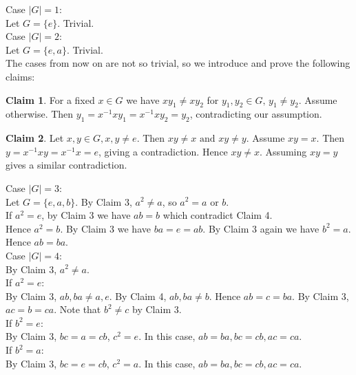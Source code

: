 \documentclass[A4paper,12pt]{article}
\theoremstyle{definition}
\newtheorem{claim}{Claim}
\numberwithin{equation}{section}
\begin{document}
\begin{enumerate}[1)]
\begin{enumerate}[(a)]
                Case $|G|=1$:\\
                Let $G = \{e\}$. Trivial.\\
                Case $|G|=2$:\\
                Let $G = \{e, a\}$. Trivial.\\
                The cases from now on are not so trivial, so we introduce and prove the following claims:\\
                \begin{claim}
                    For a fixed $x \in G$ we have $xy_{1} \neq xy_{2}$ for $y_{1}, y_{2} \in G,\, y_{1} \neq y_{2}.$
                    \proof
                    Assume otherwise. Then $y_{1} =x^{-1}xy_{1} = x^{-1}xy_{2}=y_{2}$, contradicting our assumption.
                \end{claim}
                \begin{claim}
                    Let $x, y \in G, x, y \neq e$. Then $xy\neq x \text{ and } xy\neq y$.
                    \proof
                    Assume $xy = x$. Then $y = x^{-1}xy = x^{-1}x = e$, giving a contradiction. Hence $xy\neq x$. Assuming $xy=y$ gives a similar contradiction. 
                \end{claim}
                Case $|G|=3$:\\
                Let $G = \{e, a, b\}$.
                By Claim 3, $a^{2} \neq a$, so $a^{2} = a \text{ or } b$. \\
                If $a^{2} = e$, by Claim 3 we have $ab = b$ which contradict Claim 4. \\
                Hence $a^{2} = b$. By Claim 3 we have $ba = e = ab$. By Claim 3 again we have $b^{2} = a$.
                Hence $ab = ba$.\\
                Case $|G|=4$:\\
                By Claim 3, $a^{2} \neq a$.
                \\If $a^{2} = e$:\\
                By Claim 3, $ab, ba \neq a, e$. By Claim 4, $ab, ba \neq b$. Hence $ab = c = ba$. By Claim 3, $ac = b = ca$.
                Note that $b^{2} \neq c$ by Claim 3.
                \\If $b^{2} = e$:\\
                By Claim 3, $bc = a = cb$, $c^{2} = e$.
                In this case, $ab = ba, bc = cb, ac = ca$.
                \\If $b^{2} = a$:\\
                By Claim 3, $bc = e = cb$, $c^{2} = a$. In this case, $ab = ba, bc = cb, ac = ca$.

\end{enumerate}
\end{enumerate}
\end{document}
